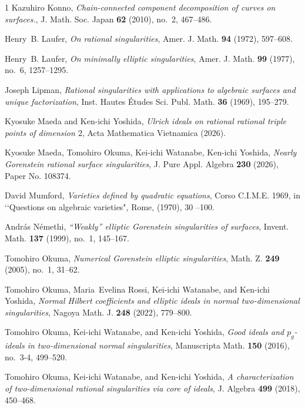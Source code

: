 \documentclass[12pt]{amsart}
\theoremstyle{definition}
\theoremstyle{remark}
\numberwithin{equation}{section}
\renewcommand{\:}{\colon}
\begin{document}
\begin{thebibliography}{1}
Kazuhiro {Konno}, \emph{{Chain-connected component decomposition of curves on
  surfaces.}}, {J. Math. Soc. Japan} \textbf{62} (2010), no.~2, 467--486.

Henry~B. Laufer, 
 \emph{On rational singularities}, Amer. J. Math. \textbf{94} (1972),
  597--608.

Henry~B. Laufer,
 \emph{On minimally elliptic singularities}, Amer. J. Math.
  \textbf{99} (1977), no.~6, 1257--1295.
  
 Joseph Lipman,
\textit{Rational singularities with applications to algebraic surfaces
and unique factorization},
Inst. Hautes \'Etudes Sci. Publ. Math.
\textbf{36} (1969), 195--279.


 Kyosuke Maeda and Ken-ichi Yoshida, 
\emph{Ulrich ideals on rational rational triple points of 
dimension $2$}, 
Acta Mathematica Vietnamica (2026). 

 Kyosuke Maeda, Tomohiro Okuma, Kei-ichi Watanabe, 
Ken-ichi Yoshida,   
\emph{Nearly Gorenstein rational surface singularities}, 
J. Pure Appl. Algebra \textbf{230} (2026),  Paper No. 108374.

  David Mumford,  \emph{Varieties defined by quadratic 
equations}, Corso C.I.M.E. 1969, in \lq\lq Questions on algebraic varieties",  
Rome,  (1970), 30 --100.


Andr\'{a}s N\'{e}methi, \emph{``{W}eakly'' elliptic {G}orenstein singularities
  of surfaces}, Invent. Math. \textbf{137} (1999), no.~1, 145--167.

Tomohiro Okuma, \emph{Numerical {G}orenstein elliptic singularities}, Math. Z.
  \textbf{249} (2005), no.~1, 31--62.

Tomohiro Okuma, Maria~Evelina Rossi, Kei-ichi Watanabe, and Ken-ichi Yoshida,
  \emph{Normal {Hilbert} coefficients and elliptic ideals in normal
  two-dimensional singularities}, Nagoya Math. J. \textbf{248} (2022),
  779--800.

Tomohiro Okuma, Kei-ichi Watanabe, and Ken-ichi Yoshida, 
\emph{Good ideals and {$p_g$}-ideals in two-dimensional normal
  singularities}, Manuscripta Math. \textbf{150} (2016), no.~3-4, 499--520.

Tomohiro Okuma, Kei-ichi Watanabe, and Ken-ichi Yoshida, 
\emph{A characterization of two-dimensional rational singularities via
  core of ideals}, J. Algebra \textbf{499} (2018), 450--468.



\end{thebibliography}
\end{document}
